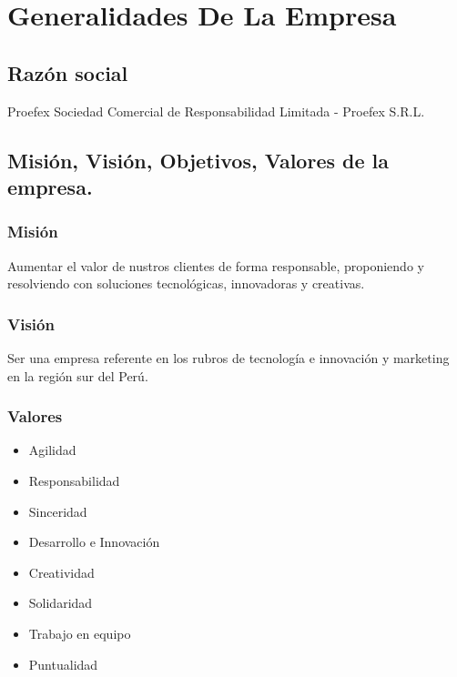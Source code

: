 \titlespacing{\chapter}{0pt}{120pt}{7pt}

\chapter{Generalidades De La Empresa}
\label{cap:generalidades}

\section{Razón social}
\label{sec:razonsocial}

Proefex Sociedad Comercial de Responsabilidad Limitada  - Proefex S.R.L.

\section{Misión, Visión, Objetivos, Valores de la empresa.}

\subsection{Misión}

Aumentar el valor de nustros clientes de forma responsable, proponiendo y resolviendo con soluciones 
tecnológicas, innovadoras y creativas.

\subsection{Visión}

Ser una empresa referente en los rubros de tecnología e innovación y marketing en la región sur del Perú.

\subsection{Valores}

\begin{itemize}
	\item Agilidad
	\item Responsabilidad
	\item Sinceridad
	\item Desarrollo e Innovación
    \item Creatividad
	\item Solidaridad
	\item Trabajo en equipo
	\item Puntualidad
\end{itemize}

